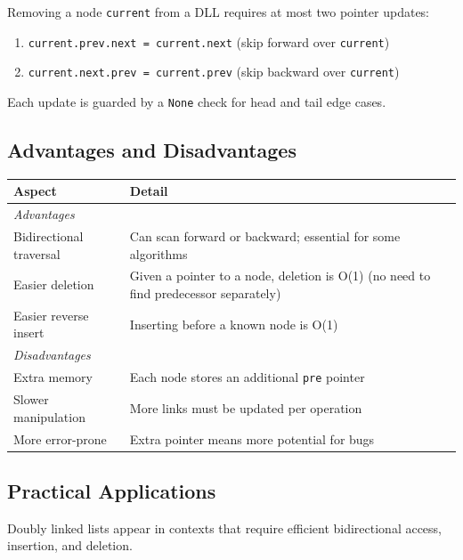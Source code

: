 \documentclass[11pt, a4paper, notitlepage]{report}
\theoremstyle{definition}
\theoremstyle{remark}
\theoremstyle{definition}
\begin{document}
\begin{keyresult}[title={Key Result: DLL Deletion Pointer Updates}]
Removing a node \texttt{current} from a DLL requires at most two pointer
updates:
\begin{enumerate}
  \item \texttt{current.prev.next = current.next} (skip forward over \texttt{current})
  \item \texttt{current.next.prev = current.prev} (skip backward over \texttt{current})
\end{enumerate}
Each update is guarded by a \texttt{None} check for head and tail edge cases.
\end{keyresult}

\subsection{Advantages and Disadvantages}
\label{subsec:dll-pros-cons}

\begin{center}
\begin{tabularx}{\linewidth}{lX}
\toprule
\textbf{Aspect} & \textbf{Detail} \\
\midrule
\multicolumn{2}{l}{\textit{Advantages}} \\
Bidirectional traversal & Can scan forward or backward; essential for some algorithms \\
Easier deletion         & Given a pointer to a node, deletion is O(1) (no need to find predecessor separately) \\
Easier reverse insert   & Inserting before a known node is O(1) \\
\midrule
\multicolumn{2}{l}{\textit{Disadvantages}} \\
Extra memory            & Each node stores an additional \texttt{pre} pointer \\
Slower manipulation     & More links must be updated per operation \\
More error-prone        & Extra pointer means more potential for bugs \\
\bottomrule
\end{tabularx}
\end{center}

\subsection{Practical Applications}
\label{subsec:dll-applications}

Doubly linked lists appear in contexts that require efficient bidirectional
access, insertion, and deletion.
\end{document}
